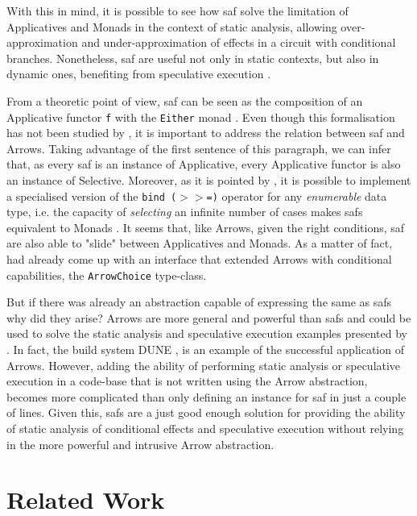 \documentclass[
  oneside,
  11pt, a4paper,
  footinclude=true,
  headinclude=true,
  cleardoublepage=empty
]{scrbook}
\theoremstyle{definition}
\theoremstyle{definition}
\begin{document}
	With this in mind, it is possible to see how \gls{saf} solve the limitation of Applicatives and Monads in the context of static analysis, allowing over-approximation and under-approximation of effects in a circuit with conditional branches. Nonetheless, \gls{saf} are useful not only in static contexts, but also in dynamic ones, benefiting from speculative execution \citep{andrey2019selective}.
	            
	From a theoretic point of view, \gls{saf} can be seen as the composition of an Applicative functor \texttt{f} with the \texttt{Either} monad \citep{andrey2019selective}. Even though this formalisation has not been studied by \cite{andrey2019selective}, it is important to address the relation between \gls{saf} and Arrows. Taking advantage of the first sentence of this paragraph, we can infer that, as every \gls{saf} is an instance of Applicative, every Applicative functor is also an instance of Selective. Moreover, as it is pointed by \cite{andrey2019selective}, it is possible to implement a specialised version of the \texttt{bind ($>>$=)} operator for any \emph{enumerable} data type, i.e. the capacity of \emph{selecting} an infinite number of cases makes \glspl{saf} equivalent to Monads \citep{gist_2019}. It seems that, like Arrows, given the right conditions, \gls{saf} are also able to "slide" between Applicatives and Monads. As a matter of fact, \cite{Hughes:2000:GMA:347238.347246} had already come up with an interface that extended Arrows with conditional capabilities, the \texttt{ArrowChoice} type-class.
	            
	But if there was already an abstraction capable of expressing the same as \glspl{saf} why did they arise? Arrows are more general and powerful than \glspl{saf} and could be used to solve the static analysis and speculative execution examples presented by \cite{andrey2019selective}. In fact, the build system DUNE \citep{dune_2018}, is an example of the successful application of Arrows. However, adding the ability of performing static analysis or speculative execution in a code-base that is not written using the Arrow abstraction, becomes more complicated than only defining an instance for \gls{saf} in just a couple of lines. Given this, \glspl{saf} are a just good enough solution for providing the ability of static analysis of conditional effects and speculative execution without relying in the more powerful and intrusive Arrow abstraction.
	            
	    \section{Related Work}\label{sec-related-work}
	    
\end{document}
